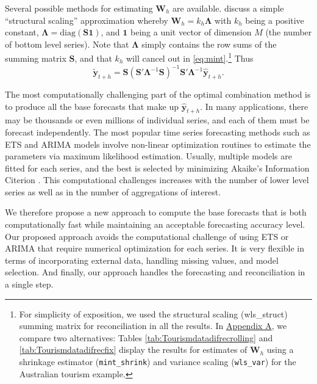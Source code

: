 \documentclass[11pt,a4paper,]{article}
\begin{document}
Several possible methods for estimating \(\bm{W}_{h}\) are available. \textcite{mint2018} discuss a simple ``structural scaling'' approximation whereby \(\bm{W}_{h} = k_{h} \bm{\Lambda}\) with \(k_{h}\) being a positive constant, \(\bm{\Lambda} = \text{diag}(\bm{S}\bm{1})\), and \(\bm{1}\) being a unit vector of dimension \(M\) (the number of bottom level series). Note that \(\bm{\Lambda}\) simply contains the row sums of the summing matrix \(\bm{S}\), and that \(k_{h}\) will cancel out in \eqref{eq:mint}.\footnote{For simplicity of exposition, we used the structural scaling (wls\_struct) summing matrix for reconciliation in all the results. In \protect\hyperlink{appendixA}{Appendix A}, we compare two alternatives: Tables \ref{tab:Tourismdatadifrecrolling} and \ref{tab:Tourismdatadifrecfix} display the results for estimates of \(\bm{W}_h\) using a shrinkage estimator (\texttt{mint\_shrink}) and variance scaling (\texttt{wls\_var}) for the Australian tourism example.} Thus
\begin{equation}\label{eq:mint2}
  \tilde{\bm{y}}_{t+h}=\bm{S}(\bm{S}'\bm{\Lambda}^{-1}\bm{S})^{-1}\bm{S}'\bm{\Lambda}^{-1}\hat{\bm{y}}_{t+h}.
\end{equation}

The most computationally challenging part of the optimal combination method is to produce all the base forecasts that make up \(\hat{\bm{y}}_{t+h}\). In many applications, there may be thousands or even millions of individual series, and each of them must be forecast independently. The most popular time series forecasting methods such as ETS and ARIMA models \autocite{fpp2} involve non-linear optimization routines to estimate the parameters via maximum likelihood estimation. Usually, multiple models are fitted for each series, and the best is selected by minimizing Akaike's Information Citerion \autocite{akaike1998information}. This computational challenges increases with the number of lower level series as well as in the number of aggregations of interest.

We therefore propose a new approach to compute the base forecasts that is both computationally fast while maintaining an acceptable forecasting accuracy level. Our proposed approach avoids the computational challenge of using ETS or ARIMA that require numerical optimization for each series. It is very flexible in terms of incorporating external data, handling missing values, and model selection. And finally, our approach handles the forecasting and reconciliation in a single step.
\end{document}
